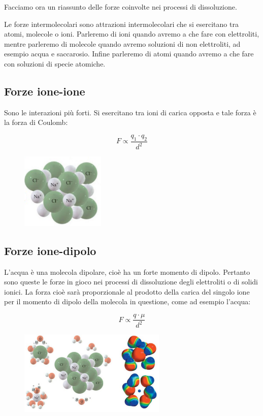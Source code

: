Facciamo ora un riassunto delle forze coinvolte nei processi di dissoluzione.

Le forze intermolecolari sono attrazioni intermolecolari che si esercitano tra atomi, molecole o ioni. Parleremo di ioni quando avremo a che fare con elettroliti, mentre parleremo di molecole quando avremo soluzioni di non elettroliti, ad esempio acqua e saccarosio. Infine parleremo di atomi quando avremo a che fare con soluzioni di specie atomiche.
\subsection{Forze ione-ione}
Sono le interazioni più forti. Si esercitano tra ioni di carica opposta e tale forza è la forza di Coulomb:

\begin{minipage}{0.5 \textwidth}
    \vspace{1cm}
    $$F \propto \frac{q_1 \cdot q_2}{d^2}$$
\end{minipage}
\begin{minipage}{0.5 \textwidth}
    \begin{figure}[H]
        \includegraphics[width=4cm]{immagini/forze_ione_ione.png}
    \end{figure}
\end{minipage}

\subsection{Forze ione-dipolo}
L'acqua è una molecola dipolare, cioè ha un forte momento di dipolo. Pertanto sono queste le forze in gioco nei processi di dissoluzione degli elettroliti o di solidi ionici. La forza cioè sarà proporzionale al prodotto della carica del singolo ione per il momento di dipolo della molecola in questione, come ad esempio l'acqua:

\begin{minipage}{0.5 \textwidth}
    \vspace{0.2cm}
    $$F \propto \frac{q \cdot \mu}{d^2}$$
\end{minipage}
\begin{minipage}{0.5 \textwidth}
    \begin{figure}[H]
        \includegraphics[width=7cm]{immagini/forze_ione_dipolo.png}
    \end{figure}
\end{minipage}

